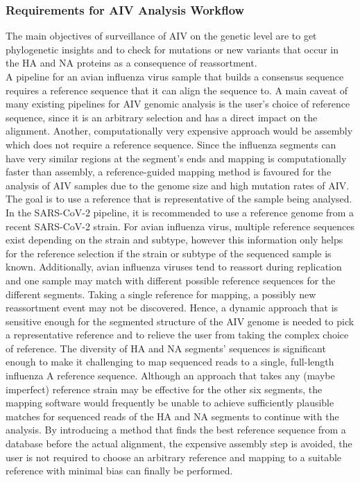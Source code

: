 \subsubsection{Requirements for AIV Analysis Workflow}
The main objectives of surveillance of \ac{AIV} on the genetic level are to get phylogenetic insights and to check for mutations or new variants that occur in the \ac{HA} and \ac{NA} proteins as a consequence of reassortment. \\
A pipeline for an avian influenza virus sample that builds a consensus sequence requires a reference sequence that it can align the sequence to. A main caveat of many existing pipelines for \ac{AIV} genomic analysis is the user's choice of reference sequence, since it is an arbitrary selection and has a direct impact on the alignment. Another, computationally very expensive approach would be assembly which does not require a reference sequence. Since the influenza segments can have very similar regions at the segment's ends and mapping is computationally faster than assembly, a reference-guided mapping method is favoured for the analysis of \ac{AIV} samples due to the genome size and high mutation rates of \ac{AIV}. The goal is to use a reference that is representative of the sample being analysed. In the \ac{SARS-CoV-2} pipeline, it is recommended to use a reference genome from a recent \ac{SARS-CoV-2} strain. For avian influenza virus, multiple reference sequences exist depending on the strain and subtype, however this information only helps for the reference selection if the strain or subtype of the sequenced sample is known. Additionally, avian influenza viruses tend to reassort during replication and one sample may match with different possible reference sequences for the different segments. Taking a single reference for mapping, a possibly new reassortment event may not be discovered. Hence, a dynamic approach that is sensitive enough for the segmented structure of the \ac{AIV} genome is needed to pick a representative reference and to relieve the user from taking the complex choice of reference. The diversity of \ac{HA} and \ac{NA} segments' sequences is significant enough to make it challenging to map sequenced reads to a single, full-length influenza A reference sequence. Although an approach that takes any (maybe imperfect) reference strain may be effective for the other six segments, the mapping software would frequently be unable to achieve sufficiently plausible matches for sequenced reads of the \ac{HA} and \ac{NA} segments to continue with the analysis. By introducing a method that finds the best reference sequence from a database before the actual alignment, the expensive assembly step is avoided, the user is not required to choose an arbitrary reference and mapping to a suitable reference with minimal bias can finally be performed. \\
